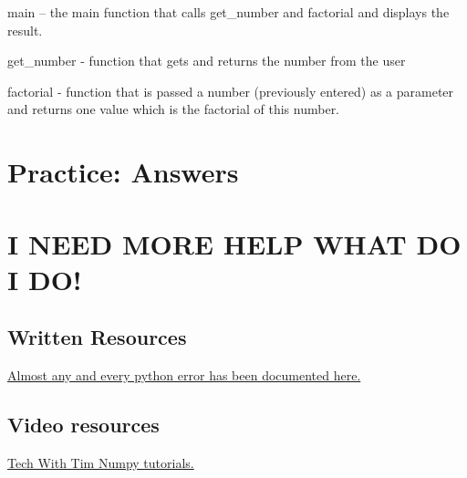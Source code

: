 \documentclass{article}
\begin{document}
	 main – the main function that calls get\_number and factorial and displays the result.  
	 
	 get\_number -  function that gets and returns the number from the user 
	 
	 factorial - function that is passed a number (previously entered) as a parameter and returns one value which is the factorial of this number. 
	 
	\section{Practice: Answers}
	
	\section{I NEED MORE HELP WHAT DO I DO!}
	\subsection{Written Resources}
	\newline
	\href{https://stackoverflow.com/}{Almost any and every python error has been documented here.}
	\subsection{Video resources}
	 \newline
	\href{https://www.youtube.com/watch?v=biLz7KPgHJA&list=PLzMcBGfZo4-ksMuZFqH5LBytux1_p7bcx}{Tech With Tim Numpy tutorials.}
	
	
	
	
\end{document}
